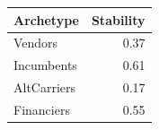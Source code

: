 \begin{tabular}{lr}
\toprule
Archetype & Stability \\
\midrule
Vendors & 0.37 \\
Incumbents & 0.61 \\
AltCarriers & 0.17 \\
Financiers & 0.55 \\
\bottomrule
\end{tabular}
